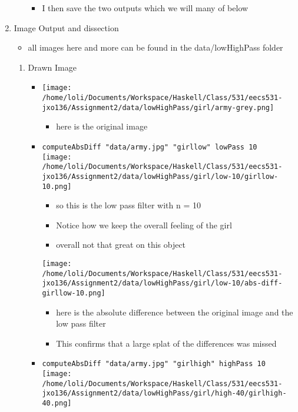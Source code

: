 \documentclass{article}
\begin{document}
\begin{enumerate}
\begin{itemize}
\begin{itemize}
\item I then save the two outputs which we will many of below
\end{itemize}
\end{itemize}
\item Image Output and dissection
\label{sec-1-3}
\begin{itemize}
\item all images here and more can be found in the data/lowHighPass folder
\end{itemize}
\begin{enumerate}
\item Drawn Image
\label{sec-1-3-1}
\begin{itemize}
\item \texttt{[image: /home/loli/Documents/Workspace/Haskell/Class/531/eecs531-jxo136/Assignment2/data/lowHighPass/girl/army-grey.png]}
\begin{itemize}
\item here is the original image
\end{itemize}
\item \texttt{computeAbsDiff "data/army.jpg" "girllow" lowPass 10}
\\
\texttt{[image: /home/loli/Documents/Workspace/Haskell/Class/531/eecs531-jxo136/Assignment2/data/lowHighPass/girl/low-10/girllow-10.png]}
\begin{itemize}
\item so this is the low pass filter with n = 10
\item Notice how we keep the overall feeling of the girl
\item overall not that great on this object
\end{itemize}
\texttt{[image: /home/loli/Documents/Workspace/Haskell/Class/531/eecs531-jxo136/Assignment2/data/lowHighPass/girl/low-10/abs-diff-girllow-10.png]}
\begin{itemize}
\item here is the absolute difference between the original image and the
low pass filter
\item This confirms that a large splat of the differences was missed
\end{itemize}
\item \texttt{computeAbsDiff "data/army.jpg" "girlhigh" highPass 10} \\
  \texttt{[image: /home/loli/Documents/Workspace/Haskell/Class/531/eecs531-jxo136/Assignment2/data/lowHighPass/girl/high-40/girlhigh-40.png]}

\end{itemize}
\end{enumerate}
\end{enumerate}
\end{document}
